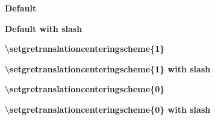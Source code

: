 \documentclass[11pt]{article}
\begin{document}

{\bfseries Default}


{\bfseries Default with slash}


{\bfseries\textbackslash{}setgretranslationcenteringscheme\{1\}}


{\bfseries\textbackslash{}setgretranslationcenteringscheme\{1\} with slash}


{\bfseries\textbackslash{}setgretranslationcenteringscheme\{0\}}


{\bfseries\textbackslash{}setgretranslationcenteringscheme\{0\} with slash}

\end{document}

